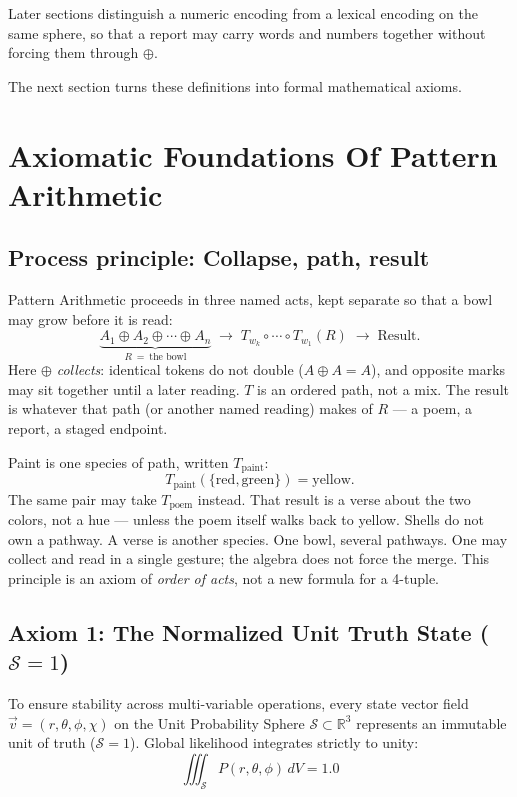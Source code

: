 \documentclass[12pt, a4paper]{article}
\begin{document}
Later sections distinguish a numeric encoding from a lexical encoding on the same sphere, so that a report may carry words and numbers together without forcing them through $\oplus$.

The next section turns these definitions into formal mathematical axioms.


\section{Axiomatic Foundations Of Pattern Arithmetic}

\subsection{Process principle: Collapse, path, result}
\label{subsec:process_principle}
Pattern Arithmetic proceeds in three named acts, kept separate so that a bowl may grow before it is read:
\begin{equation}
    \underbrace{A_1 \oplus A_2 \oplus \cdots \oplus A_n}_{R\ =\ \text{the bowl}}
    \;\longrightarrow\;
    T_{w_k}\circ \cdots \circ T_{w_1}(R)
    \;\longrightarrow\;
    \text{Result}.
    \label{eq:pipeline}
\end{equation}
Here $\oplus$ \emph{collects}: identical tokens do not double ($A \oplus A = A$), and opposite marks may sit together until a later reading. $T$ is an ordered path, not a mix. The result is whatever that path (or another named reading) makes of $R$ --- a poem, a report, a staged endpoint.

Paint is one species of path, written $T_{\mathrm{paint}}$:
\[
T_{\mathrm{paint}}(\{\mathrm{red},\mathrm{green}\}) = \mathrm{yellow}.
\]
The same pair may take $T_{\mathrm{poem}}$ instead. That result is a
verse about the two colors, not a hue --- unless the poem itself
walks back to yellow. Shells do not own a pathway. A verse is another
species. One bowl, several pathways. One may collect
and read in a single gesture; the algebra does not force the merge.
This principle is an axiom of \emph{order of acts}, not a new formula
for a 4-tuple.

\subsection{Axiom 1: The Normalized Unit Truth State ($\mathcal{S} = 1$)}
\label{subsec:axiom1}
To ensure stability across multi-variable operations, every state vector field $\vec{v} = (r, \theta, \phi, \chi)$ on the Unit Probability Sphere $\mathcal{S} \subset \mathbb{R}^3$ represents an immutable unit of truth ($\mathcal{S} = 1$). Global likelihood integrates strictly to unity:
\begin{equation}
    \iiint_{\mathcal{S}} P(r, \theta, \phi) \, dV = 1.0
    \label{eq:unit_truth}
\end{equation}
\end{document}
